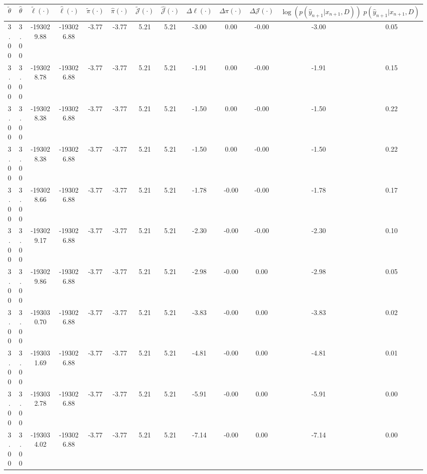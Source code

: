 \begin{table}[htbp]
        \centering
        \tiny
        \begin{adjustbox}{angle=90}
            \begin{tabular}{|c|c|c|c|c|c|c|c|c|c|c|c|c|}
                \hline
                 $\tilde{\theta}$ & $\hat{\theta}$ & $\tilde{\ell}(\cdot)$ & $\hat{\ell}(\cdot)$ & $\tilde{\pi}(\cdot)$ & $\hat{\pi}(\cdot)$ & $\tilde{\mathcal{J}}(\cdot)$ & $\hat{\mathcal{J}}(\cdot)$ & $\Delta \ell(\cdot)$ & $\Delta \pi(\cdot)$ & $\Delta \mathcal{J}(\cdot)$ & $\log(p(\hat{y}_{n+1}|x_{n+1}, D))$ & $p(\hat{y}_{n+1}|x_{n+1}, D)$ \\
                \hline
                 3.00 & 3.00 & -193029.88 & -193026.88 & -3.77 & -3.77 & 5.21 & 5.21 & -3.00 & 0.00 & -0.00 & -3.00 & 0.05\\ \hline
 3.00 & 3.00 & -193028.78 & -193026.88 & -3.77 & -3.77 & 5.21 & 5.21 & -1.91 & 0.00 & -0.00 & -1.91 & 0.15\\ \hline
 3.00 & 3.00 & -193028.38 & -193026.88 & -3.77 & -3.77 & 5.21 & 5.21 & -1.50 & 0.00 & -0.00 & -1.50 & 0.22\\ \hline
 3.00 & 3.00 & -193028.38 & -193026.88 & -3.77 & -3.77 & 5.21 & 5.21 & -1.50 & 0.00 & -0.00 & -1.50 & 0.22\\ \hline
 3.00 & 3.00 & -193028.66 & -193026.88 & -3.77 & -3.77 & 5.21 & 5.21 & -1.78 & -0.00 & -0.00 & -1.78 & 0.17\\ \hline
 3.00 & 3.00 & -193029.17 & -193026.88 & -3.77 & -3.77 & 5.21 & 5.21 & -2.30 & -0.00 & -0.00 & -2.30 & 0.10\\ \hline
 3.00 & 3.00 & -193029.86 & -193026.88 & -3.77 & -3.77 & 5.21 & 5.21 & -2.98 & -0.00 & 0.00 & -2.98 & 0.05\\ \hline
 3.00 & 3.00 & -193030.70 & -193026.88 & -3.77 & -3.77 & 5.21 & 5.21 & -3.83 & -0.00 & 0.00 & -3.83 & 0.02\\ \hline
 3.00 & 3.00 & -193031.69 & -193026.88 & -3.77 & -3.77 & 5.21 & 5.21 & -4.81 & -0.00 & 0.00 & -4.81 & 0.01\\ \hline
 3.00 & 3.00 & -193032.78 & -193026.88 & -3.77 & -3.77 & 5.21 & 5.21 & -5.91 & -0.00 & 0.00 & -5.91 & 0.00\\ \hline
 3.00 & 3.00 & -193034.02 & -193026.88 & -3.77 & -3.77 & 5.21 & 5.21 & -7.14 & -0.00 & 0.00 & -7.14 & 0.00\\ \hline
            \end{tabular}
        \end{adjustbox}
        \caption{}
        \label{}
    \end{table}
    
